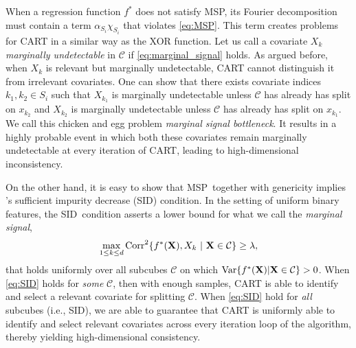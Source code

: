 \documentclass[11pt]{article}
\newcommand{\bx}{\mathbf{x}}
\newcommand{\bX}{\mathbf{X}}
\DeclarePairedDelimiter{\braces}{\lbrace}{\rbrace}
\newcommand{\Var}{\operatorname{Var}}
\newcommand{\cell}{\mathcal{C}}
\newcommand{\nfeats}{d}
\newcommand{\MSP}{\textsf{MSP}}
\newcommand{\SID}{\textsf{SID}}
\newcommand{\monomial}{\chi}
\newcommand{\Corr}{\operatorname{Corr}}
\begin{document}
When a regression function $f^*$ does not satisfy \MSP, its Fourier decomposition must contain a term $\alpha_{S_i}\monomial_{S_i}$ that violates \eqref{eq:MSP}.
This term creates problems for CART in a similar way as the XOR function.
Let us call a covariate $X_k$ \emph{marginally undetectable} in $\cell$ if \eqref{eq:marginal_signal} holds.
As argued before, when $X_k$ is relevant but marginally undetectable, CART cannot distinguish it from irrelevant covariates.
One can show that there exists covariate indices $k_1,k_2 \in S_i$ such that $X_{k_1}$ is marginally undetectable
unless $\cell$ has already has split on $x_{k_2}$ and $X_{k_2}$ is marginally undetectable
unless $\cell$ has already has split on $x_{k_1}$.
We call this chicken and egg problem \emph{marginal signal bottleneck}.
It results in a highly probable event in which both these covariates remain marginally undetectable at every iteration of CART, leading to high-dimensional inconsistency.

On the other hand, it is easy to show that \MSP~together with genericity implies \citet{chi2022asymptotic}'s sufficient impurity decrease (\SID) condition.
In the setting of uniform binary features, the \SID~condition asserts a lower bound for what we call the \emph{marginal signal},
\begin{equation}
    \label{eq:SID}
    \max_{1 \leq k \leq \nfeats}\Corr^2\braces*{f^*(\bX),X_k~|~\bX \in \cell} \geq \lambda,
\end{equation}
that holds uniformly over all subcubes $\cell$ on which $\Var\braces*{f^*(\bX)|\bX \in\cell} > 0$.
When \eqref{eq:SID} holds for \emph{some} $\cell$, then with enough samples, CART is able to identify and select a relevant covariate for splitting $\cell$.
When \eqref{eq:SID} hold for \emph{all} subcubes (i.e., \SID), we are able to guarantee that CART is uniformly able to identify and select relevant covariates across every iteration loop of the algorithm, thereby yielding high-dimensional consistency.
\end{document}
